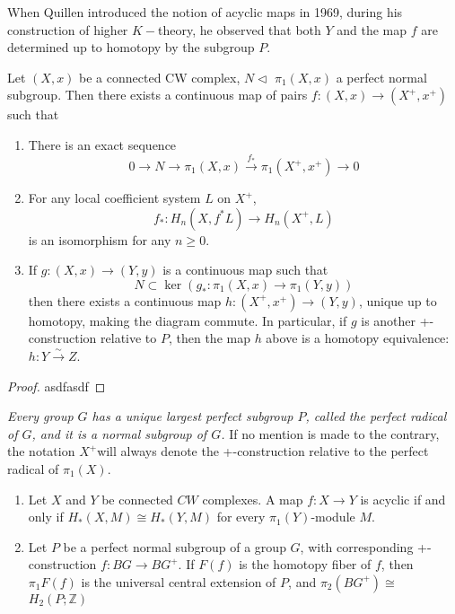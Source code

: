 When Quillen introduced the notion of acyclic maps in 1969, during his construction of higher $K-$theory, he observed that both $Y$ and the map $f$ are determined up to homotopy by the subgroup $P$.

\begin{theo}[Quillen]
Let $(X, x)$ be a connected CW complex, $N \triangleleft$ $\pi_1(X, x)$ a perfect normal subgroup. Then there exists a continuous map of pairs $f:(X, x) \longrightarrow\left(X^{+}, x^{+}\right)$ such that
\begin{enumerate}
    \item There is an exact sequence
    $$
    0 \longrightarrow N \longrightarrow \pi_1(X, x) \xrightarrow{f_*} \pi_1\left(X^{+}, x^{+}\right) \longrightarrow 0
    $$
    \item For any local coefficient system $L$ on $X^{+}$,
    $$
    f_*: H_n\left(X, f^* L\right) \longrightarrow H_n\left(X^{+}, L\right)
    $$
    is an isomorphism for any $n \geq 0$.
    \item If $g:(X, x) \longrightarrow(Y, y)$ is a continuous map such that
    $$
    N \subset \operatorname{ker}\left(g_*: \pi_1(X, x) \longrightarrow \pi_1(Y, y)\right)
    $$
    then there exists a continuous map $h:\left(X^{+}, x^{+}\right) \longrightarrow(Y, y)$, unique up to homotopy, making the diagram commute.
    In particular, if $g$ is another +-construction relative to $P$, then the map $h$ above is a homotopy equivalence: $h: Y \xrightarrow{\sim} Z$.
\end{enumerate}
\end{theo}
\begin{proof}
    asdfasdf
\end{proof}

\textit{Every group $G$ has a unique largest perfect subgroup $P$, called the perfect radical of $G$, and it is a normal subgroup of $G$. }If no mention is made to the contrary, the notation $X^{+}$will always denote the +-construction relative to the perfect radical of $\pi_1(X)$.

\begin{prop} %
    \begin{enumerate}
        \item Let $X$ and $Y$ be connected $C W$ complexes. A map $f: X \rightarrow Y$ is acyclic if and only if $H_*(X, M) \cong H_*(Y, M)$ for every $\pi_1(Y)$-module $M$.
        \item Let $P$ be a perfect normal subgroup of a group $G$, with corresponding +-construction $f: B G \rightarrow B G^{+}$. If $F(f)$ is the homotopy fiber of $f$, then $\pi_1 F(f)$ is the universal central extension of $P$, and $\pi_2\left(B G^{+}\right) \cong$ $H_2(P ; \mathbb{Z})$
    \end{enumerate}
\end{prop}




